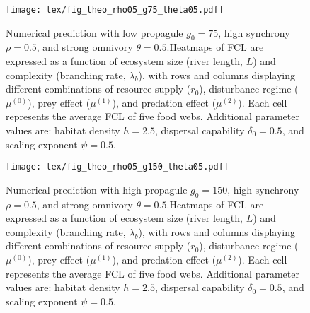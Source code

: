 \begin{figure}
\centering
\texttt{[image: tex/fig\_theo\_rho05\_g75\_theta05.pdf]}
\caption{Numerical prediction with low propagule $g_0 = 75$, high synchrony $\rho = 0.5$, and strong omnivory $\theta = 0.5$.Heatmaps of FCL are expressed as a function of ecosystem size (river length, $L$)
and complexity (branching rate, $\lambda_b$), with rows and columns displaying
different combinations of resource supply ($r_0$), disturbance regime
($\mu^{(0)}$), prey effect ($\mu^{(1)}$), and predation effect ($\mu^{(2)}$).
Each cell represents the average FCL of five food webs.
Additional parameter values are: habitat density $h=2.5$, dispersal capability $\delta_0=0.5$, and scaling exponent $\psi=0.5$.}
\label{fig:fig-num7}
\end{figure}
\newpage

\begin{figure}
\centering
\texttt{[image: tex/fig\_theo\_rho05\_g150\_theta05.pdf]}
\caption{Numerical prediction with high propagule $g_0 = 150$, high synchrony $\rho = 0.5$, and strong omnivory $\theta = 0.5$.Heatmaps of FCL are expressed as a function of ecosystem size (river length, $L$)
and complexity (branching rate, $\lambda_b$), with rows and columns displaying
different combinations of resource supply ($r_0$), disturbance regime
($\mu^{(0)}$), prey effect ($\mu^{(1)}$), and predation effect ($\mu^{(2)}$).
Each cell represents the average FCL of five food webs.
Additional parameter values are: habitat density $h=2.5$, dispersal capability $\delta_0=0.5$, and scaling exponent $\psi=0.5$.}
\label{fig:fig-num8}
\end{figure}
\newpage

